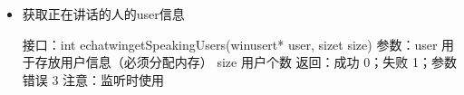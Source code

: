 \documentclass[letterpaper,10pt,english]{sphinxmanual}
\begin{document}
\begin{itemize}
%
\begin{sphinxVerbatim}[commandchars=\\\{\}]
接口：size\PYGZus{}t echat\PYGZus{}win\PYGZus{}getSpeakingUsersSize()
返回：正在讲话人的个数
注意：监听时使用
\end{sphinxVerbatim}

\item {} 
获取正在讲话的人的user信息

%
\begin{sphinxVerbatim}[commandchars=\\\{\}]
接口：int echat\PYGZus{}win\PYGZus{}getSpeakingUsers(win\PYGZus{}user\PYGZus{}t* user, size\PYGZus{}t size)
参数：user  用于存放用户信息（必须分配内存）
  size  用户个数
返回：成功  0；失败 \PYGZhy{}1；参数错误 \PYGZhy{}3
注意：监听时使用
\end{sphinxVerbatim}

\end{itemize}
\end{document}
